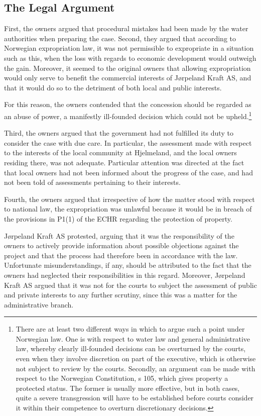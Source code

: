 \subsection{The Legal Argument}\label{view}

First, the owners argued that procedural mistakes had been made by the water authorities when preparing the case. Second, they argued that according to Norwegian expropriation law, it was not permissible to expropriate in a situation such as this, when the loss with regards to economic development would outweigh the gain. Moreover, it seemed to the original owners that allowing expropriation would only serve to benefit the commercial interests of Jørpeland Kraft AS, and that it would do so to the detriment of both local and public interests. 

For this reason, the owners contended that the concession should be regarded as an abuse of power, a manifestly ill-founded decision which could not be upheld.\footnote{There are at least two different ways in which to argue such a point under Norwegian law. One is with respect to water law and general administrative law, whereby clearly ill-founded decisions can be overturned by the courts, even when they involve discretion on part of the executive, which is otherwise not subject to review by the courts. Secondly, an argument can be made with respect to the Norwegian Constitution, s 105, which gives property a protected status. The former is usually more effective, but in both cases, quite a severe transgression will have to be established before courts consider it within their competence to overturn discretionary decisions.} 

Third, the owners argued that the government had not fulfilled its duty to consider the case with due care. In particular, the assessment made with respect to the interests of the local community at Hjelmeland, and the local owners residing there, was not adequate. Particular attention was directed at the fact that local owners had not been informed about the progress of the case, and had not been told of assessments pertaining to their interests.

Fourth, the owners argued that irrespective of how the matter stood with respect to national law, the expropriation was unlawful because it would be in breach of the provisions in P1(1) of the ECHR regarding the protection of property.

Jørpeland Kraft AS protested, arguing that it was the responsibility of the owners to actively provide information about possible objections against the project and that the process had therefore been in accordance with the law. Unfortunate misunderstandings, if any, should be attributed to the fact that the owners had neglected their responsibilities in this regard. Moreover, Jørpeland Kraft AS argued that it was not for the courts to subject the assessment of public and private interests to any further scrutiny, since this was a matter for the administrative branch.

